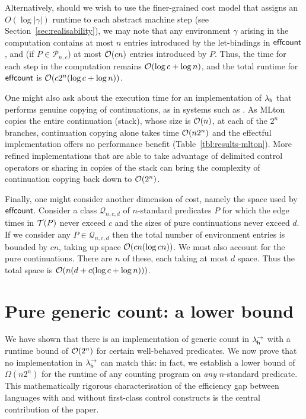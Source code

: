 \documentclass[12pt,phd,lfcs,twoside,openright,logo,leftchapter,normalheadings]{infthesis}
\theoremstyle{plain}
\theoremstyle{definition}
\begin{document}
Alternatively, should we wish to use the finer-grained cost model that
assigns an $O(\log |\gamma|)$ runtime to each abstract machine step
(see Section~\ref{sec:realisability}), we may note that any
environment $\gamma$ arising in the computation contains at most $n$
entries introduced by the let-bindings in $\mathsf{effcount}$, and (if $P \in
\mathcal{P}_{n,c}$) at most $\mathcal{O}(cn)$ entries introduced by $P$.
Thus, the time for each step in the computation remains $\mathcal{O}(\log c
+ \log n)$, and the total runtime for $\mathsf{effcount}$ is $\mathcal{O}(c 2^n (\log
c + \log n))$.

One might also ask about the execution time for an implementation of
$\lambda_{\mathsf{h}}$ that performs genuine copying of continuations, as in systems
such as \citet{mlton}.
%
As MLton copies the entire continuation (stack), whose size is
$\mathcal{O}(n)$, at each of the $2^n$ branches, continuation copying alone
takes time $\mathcal{O}(n2^n)$ and the effectful implementation offers no
performance benefit (Table~\ref{tbl:results-mlton}).
%
More refined implementations \citep{FarvardinR20, FlattD20} that are
able to take advantage of delimited control operators or sharing in
copies of the stack can bring the complexity of continuation copying
back down to $\mathcal{O}(2^n)$.

Finally, one might consider another dimension of cost, namely the
space used by $\mathsf{effcount}$.
%
Consider a class $\mathcal{Q}_{n,c,d}$ of $n$-standard predicates $P$
for which the edge times in $\mathcal{T}(P)$ never exceed $c$ and the sizes of
pure continuations never exceed $d$.
%
If we consider any $P \in \mathcal{Q}_{n,c,d}$ then the total number
of environment entries is bounded by $cn$, taking up space
$\mathcal{O}(cn(\log cn))$.
%
We must also account for the pure continuations. There are $n$ of
these, each taking at most $d$ space.
%
Thus the total space is $\mathcal{O}(n(d + c(\log c + \log n)))$.

\section{Pure generic count: a lower bound}
\label{sec:pure-counting}

\newcommand{\naivecount}{\dec{naivecount}}
\newcommand{\lazycount}{\dec{lazycount}}
\newcommand{\BergerCount}{\dec{BergerCount}}
\newcommand{\bestshot}{\dec{bestshot}}
\newcommand{\FF}{\mathcal{F}}
\newcommand{\GG}{\mathcal{G}}

We have shown that there is an implementation of generic count in
$\lambda^\rightarrow_{\mathsf{h}}$ with a runtime bound of $\mathcal{O}(2^n)$ for certain well-behaved
predicates. We now prove that no implementation in $\lambda^\rightarrow_{\mathsf{b}}$ can match
this: in fact, we establish a lower bound of $\Omega(n2^n)$ for the
runtime of any counting program on \emph{any} $n$-standard predicate.
This mathematically rigorous characterisation of the efficiency gap
between languages with and without first-class control constructs is
the central contribution of the paper.
\end{document}
